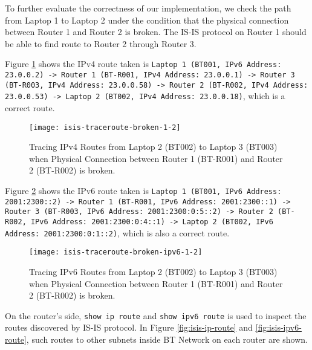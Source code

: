 \clearpage

To further evaluate the correctness of our implementation, we check the path from Laptop 1 to Laptop 2 under the condition that the physical connection between Router 1 and Router 2 is broken. The IS-IS protocol on Router 1 should be able to find route to Router 2 through Router 3.

Figure \ref{fig:isis-traceroute-broken} shows the IPv4 route taken is 
\texttt{Laptop 1 (BT001, IPv6 Address: 23.0.0.2)
-> Router 1 (BT-R001, IPv4 Address: 23.0.0.1) 
-> Router 3 (BT-R003, IPv4 Address: 23.0.0.58) 
-> Router 2 (BT-R002, IPv4 Address: 23.0.0.53)
-> Laptop 2 (BT002, IPv4 Address: 23.0.0.18)}, which is a correct route.


\begin{figure}[ht!]
    \centering
    \texttt{[image: isis-traceroute-broken-1-2]}
    \caption{Tracing IPv4 Routes from Laptop 2 (BT002) to Laptop 3 (BT003) when Physical Connection between Router 1 (BT-R001) and Router 2 (BT-R002) is broken.}
    \label{fig:isis-traceroute-broken}
\end{figure}

Figure \ref{fig:isis-traceroute-broken-ipv6} shows the IPv6 route taken is 
\texttt{Laptop 1 (BT001, IPv6 Address: 2001:2300::2)
-> Router 1 (BT-R001, IPv6 Address: 2001:2300::1) 
-> Router 3 (BT-R003, IPv6 Address: 2001:2300:0:5::2) 
-> Router 2 (BT-R002, IPv6 Address: 2001:2300:0:4::1)
-> Laptop 2 (BT002, IPv6 Address: 2001:2300:0:1::2)}, which is also a correct route.

\begin{figure}[ht!]
    \centering
    \texttt{[image: isis-traceroute-broken-ipv6-1-2]}
    \caption{Tracing IPv6 Routes from Laptop 2 (BT002) to Laptop 3 (BT003) when Physical Connection between Router 1 (BT-R001) and Router 2 (BT-R002) is broken.}
    \label{fig:isis-traceroute-broken-ipv6}
\end{figure}

\clearpage

On the router's side, \texttt{show ip route} and \texttt{show ipv6 route} is used to inspect the routes discovered by IS-IS protocol. In Figure \ref{fig:isis-ip-route} and \ref{fig:isis-ipv6-route}, such routes to other subnets inside BT Network on each router are shown.

